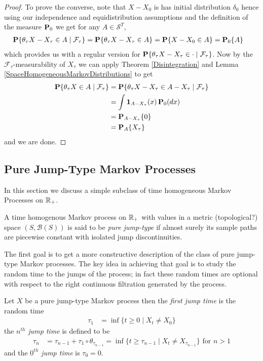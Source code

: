 \begin{proof}
To prove the converse, note that $X - X_0$ is has
initial distribution $\delta_0$ hence using our independence and
equidistribution assumptions and the definition of the measure
$\probabilityop_0$ we get for any $A \in \mathcal{S}^T$,
\begin{align*}
\cprobability{\mathcal{F}_\tau}{\theta_\tau X - X_\tau \in A} &=
\probability{\theta_\tau X - X_\tau \in A} 
=\probability{X - X_0 \in A} 
=\sprobability{A}{0}
\end{align*}
which provides us with a regular version for
$\cprobability{\mathcal{F}_\tau}{\theta_\tau X - X_\tau \in \cdot}$.
Now by the $\mathcal{F}_\tau$-measurability of $X_\tau$ we can apply
Theorem \ref{Disintegration} and Lemma
\ref{SpaceHomogeneousMarkovDistributions} to get
\begin{align*}
\cprobability{\mathcal{F}_\tau}{\theta_\tau X \in A}
&=\cprobability{\mathcal{F}_\tau}{\theta_\tau X - X_\tau \in A-X_\tau}\\
&= \int \characteristic{A-X_\tau}(x) \, \probabilityop_0(dx) \\
&=\sprobability{0}{A - X_\tau} \\
&=\sprobability{X_\tau}{A }
\end{align*}
and we are done.
\end{proof}

\subsection{Pure Jump-Type Markov Processes}
In this section we discuss a simple subclass of time homogeneous
Markov Processes on $\reals_+$.
\begin{defn}A time homogenous Markov process on $\reals_+$ with values
  in a metric (topological?) space $(S, \mathcal{B}(S))$ is said to be \emph{pure
    jump-type} if almost surely its sample paths are piecewise
  constant with isolated jump discontinuities.
\end{defn}

The first goal is to get a more constructive description of the class
of pure jump-type Markov processes.  The key idea in achieving that goal
is to study the random time to the jumps of the process; in fact these
random times are optional with respect to the right continuous
filtration generated by the process.

\begin{defn}Let $X$ be a pure jump-type Markov process then the
  \emph{first jump time} is the random time
\begin{align*}
\tau_1 &=\inf \lbrace t \geq 0 \mid X_t \neq X_0 \rbrace
\end{align*}
 the \emph{$n^{th}$ jump time} is defined to be 
\begin{align*}
\tau_n &= \tau_{n-1} + \tau_1 \circ \theta_{\tau_{n-1}} = \inf \lbrace
t \geq \tau_{n-1} \mid X_t \neq X_{\tau_{n-1}} \rbrace \text{ for $n > 1$}
\end{align*}
and the \emph{$0^{th}$ jump time} is $\tau_0 = 0$.
\end{defn}

